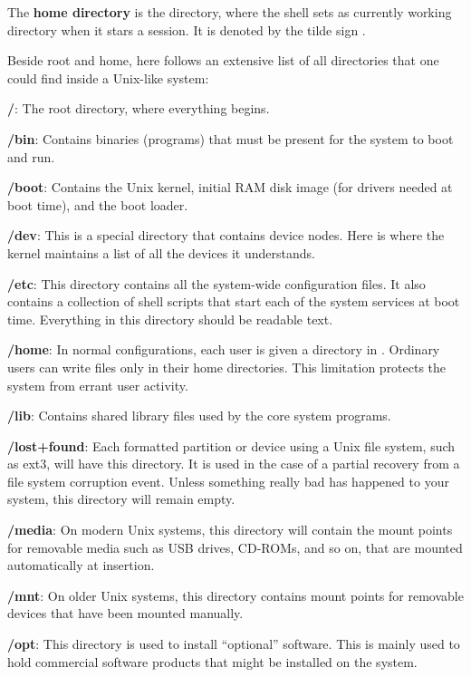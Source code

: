 The \textbf{home directory} is the directory, where the shell sets as currently working directory when it stars a
session. It is denoted by the tilde sign \code{$\sim$}.
\ed

Beside root and home, here follows an extensive list of all directories that one could find inside a Unix-like system:
\bit
\item \textbf{/}: The root directory, where everything begins.
\item \textbf{/bin}: Contains binaries (programs) that must be present for the system to boot and run.
\item \textbf{/boot}: Contains the Unix kernel, initial RAM disk image (for drivers needed at boot time), and the
boot loader.
\item \textbf{/dev}: This is a special directory that contains device nodes. Here is where the kernel maintains a list
of all the devices it understands.
\item \textbf{/etc}: This directory contains all the system-wide configuration files. It also contains a
collection of shell scripts that start each of the system services at boot time. Everything in this directory should
be readable text.
\item \textbf{/home}: In normal configurations, each user is given a directory in . Ordinary users can write
files only in their home directories. This limitation protects the system from errant user activity.
\item \textbf{/lib}: Contains shared library files used by the core system programs.
\item \textbf{/lost+found}: Each formatted partition or device using a Unix file system, such as ext3, will have
this directory. It is used in the case of a partial recovery from a file system corruption event. Unless something
really bad has happened to your system, this directory will remain empty.
\item \textbf{/media}: On modern Unix systems, this directory will contain the mount points for removable
media such as USB drives, CD-ROMs, and so on, that are mounted automatically at insertion.
\item \textbf{/mnt}: On older Unix systems, this directory contains mount points for removable devices that have
been mounted manually.
\item \textbf{/opt}: This directory is used to install ``optional'' software. This is mainly used to hold
commercial software products that might be installed on the system.

